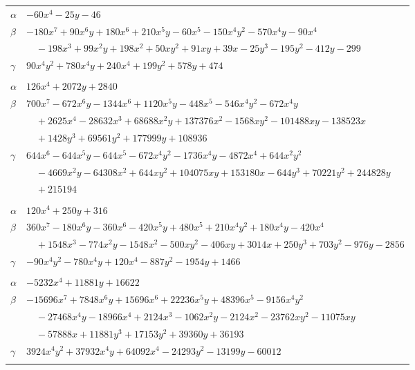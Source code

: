 \documentclass[11pt]{article}
\begin{document}
\begin{longtable}{@{}ll@{}}
$\alpha$ & $-60x^{4}-25y-46$\\
$\beta$ & $-180x^{7}+90x^{6}y+180x^{6}+210x^{5}y-60x^{5}-150x^{4}y^{2}-570x^{4}y-90x^{4}$\\
 & $\quad -198x^{3}+99x^{2}y+198x^{2}+50xy^{2}+91xy+39x-25y^{3}-195y^{2}-412y-299$\\
$\gamma$ & $90x^{4}y^{2}+780x^{4}y+240x^{4}+199y^{2}+578y+474$\\
\addlinespace[3pt]
\multicolumn{2}{@{}l}{$\{i,j\}=\{11,35\}$, $k_{ij}=2\cdot 3^{4}$}\\
$\alpha$ & $126x^{4}+2072y+2840$\\
$\beta$ & $700x^{7}-672x^{6}y-1344x^{6}+1120x^{5}y-448x^{5}-546x^{4}y^{2}-672x^{4}y$\\
 & $\quad +2625x^{4}-28632x^{3}+68688x^{2}y+137376x^{2}-1568xy^{2}-101488xy-138523x$\\
 & $\quad +1428y^{3}+69561y^{2}+177999y+108936$\\
$\gamma$ & $644x^{6}-644x^{5}y-644x^{5}-672x^{4}y^{2}-1736x^{4}y-4872x^{4}+644x^{2}y^{2}$\\
 & $\quad -4669x^{2}y-64308x^{2}+644xy^{2}+104075xy+153180x-644y^{3}+70221y^{2}+244828y$\\
 & $\quad +215194$\\
\addlinespace[3pt]
\multicolumn{2}{@{}l}{$\{i,j\}=\{11,40\}$, $k_{ij}=2^{8}\cdot 5\cdot 7$}\\
$\alpha$ & $120x^{4}+250y+316$\\
$\beta$ & $360x^{7}-180x^{6}y-360x^{6}-420x^{5}y+480x^{5}+210x^{4}y^{2}+180x^{4}y-420x^{4}$\\
 & $\quad +1548x^{3}-774x^{2}y-1548x^{2}-500xy^{2}-406xy+3014x+250y^{3}+703y^{2}-976y-2856$\\
$\gamma$ & $-90x^{4}y^{2}-780x^{4}y+120x^{4}-887y^{2}-1954y+1466$\\
\addlinespace[3pt]
\multicolumn{2}{@{}l}{$\{i,j\}=\{11,60\}$, $k_{ij}=2^{2}\cdot 3^{3}\cdot 5\cdot 7\cdot 17$}\\
$\alpha$ & $-5232x^{4}+11881y+16622$\\
$\beta$ & $-15696x^{7}+7848x^{6}y+15696x^{6}+22236x^{5}y+48396x^{5}-9156x^{4}y^{2}$\\
 & $\quad -27468x^{4}y-18966x^{4}+2124x^{3}-1062x^{2}y-2124x^{2}-23762xy^{2}-11075xy$\\
 & $\quad -57888x+11881y^{3}+17153y^{2}+39360y+36193$\\
$\gamma$ & $3924x^{4}y^{2}+37932x^{4}y+64092x^{4}-24293y^{2}-13199y-60012$\\
\addlinespace[3pt]

\end{longtable}
\end{document}
